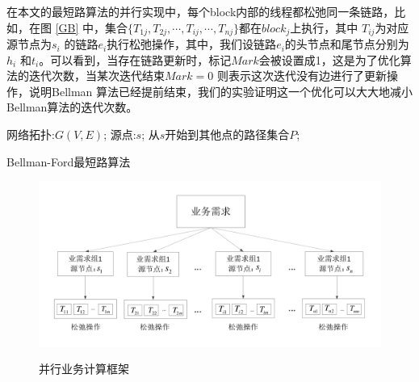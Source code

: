 在本文的最短路算法的并行实现中，每个block内部的线程都松弛同一条链路，比如，在图 \ref{GB} 中，集合$\{T_{1j}, T_{2j}, \cdots, T_{ij}, \cdots, T_{nj}\}$都在$block_j$上执行，其中 $T_{ij}$为对应源节点为$s_i$ 的链路$e_i$执行松弛操作，其中，我们设链路$e_i$的头节点和尾节点分别为$h_i$ 和$t_i$。可以看到，当存在链路更新时，标记$Mark$会被设置成1，这是为了优化算法的迭代次数，当某次迭代结束$Mark=0$ 则表示这次迭代没有边进行了更新操作，说明Bellman 算法已经提前结束，我们的实验证明这一个优化可以大大地减小Bellman算法的迭代次数。
\begin{algorithm}[htb]
\begin{algorithmic}[1]
\Require
网络拓扑:$G(V, E)$;
源点:$s$;
\Ensure
从$s$开始到其他点的路径集合$P$;
\EndFor
{}
\EndIf
\EndFor
\EndWhile
{}
\end{algorithmic}
\caption{{Bellman-Ford最短路算法}}
\label{Bellman}
\end{algorithm}


\begin{figure}
\vspace{-0.5cm}
\setlength{\abovecaptionskip}{-0.5cm}
\begin{center}
{\includegraphics[width=1 \textwidth]{figures/paframework.pdf}}
\end{center}
\caption{{\footnotesize{并行业务计算框架}}}
\label{ParFramework}
\end{figure}




